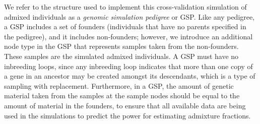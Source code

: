We refer to the structure used to implement this cross-validation simulation
of admixed individuals as
a {\em genomic simulation pedigree} or GSP.  Like any pedigree,
a GSP includes a set of founders (individuals that have no parents specified in the
pedigree), and it includes non-founders; however, we introduce an additional node
type in the GSP that represents samples taken from the non-founders. These samples
are the simulated admixed individuals.  A GSP must have no inbreeding loops, since
any inbreeding loop indicates that more than one copy of a gene in an ancestor may
be created amongst its descendants, which is a type of sampling with
replacement.  Furthermore, in a GSP, the amount of genetic material taken from the
samples at the sample nodes should be equal to the amount of material in the founders,
to ensure that all available data are being used in the simulations to predict the power for
estimating admixture fractions.

